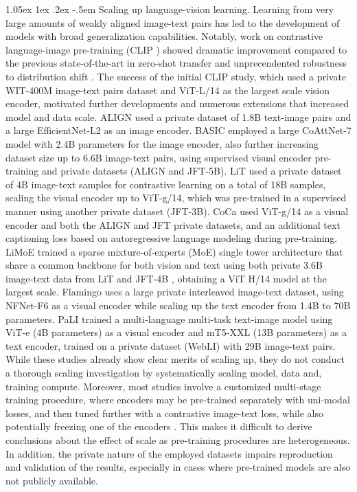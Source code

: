 \documentclass[11pt,table]{article}
\makeatletter
\newcommand{\citep}{\cite}
\renewcommand\paragraph{\@startsection{paragraph}{4}{\z@}                                     {1.05ex \@plus1ex \@minus.2ex}                                {-.5em}
{\normalfont\normalsize\bfseries}}
\makeatother
\begin{document}
\paragraph{Scaling up language-vision learning.} Learning from very large amounts of weakly aligned image-text pairs has led to the development of models with broad generalization capabilities.
Notably, work on contrastive language-image pre-training (CLIP \citep{radford2021learning}) showed dramatic improvement compared to the previous state-of-the-art in zero-shot transfer and unprecendented robustness to distribution shift \citep{Taori2020,miller2021accuracy,nguyen2022quality,fang2022data}. 
The success of the initial CLIP study, which used a private WIT-400M image-text pairs dataset and ViT-L/14 as the largest scale vision encoder, motivated further developments and numerous extensions that increased model and data scale. ALIGN \citep{ALIGN} used a private dataset of 1.8B text-image pairs and a large EfficientNet-L2 as an image encoder. BASIC \citep{basic} employed a large CoAttNet-7 model with 2.4B parameters for the image encoder, also further increasing dataset size up to 6.6B image-text pairs, using supervised visual encoder pre-training and private datasets (ALIGN and JFT-5B). LiT \citep{zhai2021lit} used a private dataset of 4B image-text samples for contrastive learning on a total of 18B samples, scaling the visual encoder up to ViT-g/14, which was pre-trained in a supervised manner using another private dataset (JFT-3B). CoCa \citep{yu2022coca} used ViT-g/14 as a visual encoder and both the ALIGN and JFT private datasets, and an additional text captioning loss based on autoregressive language modeling during pre-training. LiMoE \citep{mustafa2022multimodal} trained a sparse mixture-of-experts (MoE) single tower architecture that share a common backbone for both vision and text using both private 3.6B image-text data from LiT and JFT-4B \citep{Zhai2022scaling}, obtaining a ViT H/14 model at the largest scale. Flamingo \citep{alayrac2022flamingo} uses a large private interleaved image-text dataset, using NFNet-F6 as a visual encoder while scaling up the text encoder from 1.4B to 70B parameters. PaLI \citep{chen2022pali} trained a multi-language multi-task text-image model using ViT-e (4B parameters) as a visual encoder and mT5-XXL (13B parameters) as a text encoder, trained on a private dataset (WebLI) with 29B image-text pairs. While these studies already show clear merits of scaling up, they do not conduct a thorough scaling investigation by systematically scaling model, data and, training compute. Moreover, most studies involve a customized multi-stage training procedure, where encoders may be pre-trained separately with uni-modal losses, and then tuned further with a contrastive image-text loss, while also potentially freezing one of the encoders \citep{basic,zhai2021lit}. This makes it difficult to derive conclusions about the effect of scale as pre-training procedures are heterogeneous. In addition, the private nature of the employed datasets impairs reproduction and validation of the results, especially in cases where pre-trained models are also not publicly available.
\end{document}
